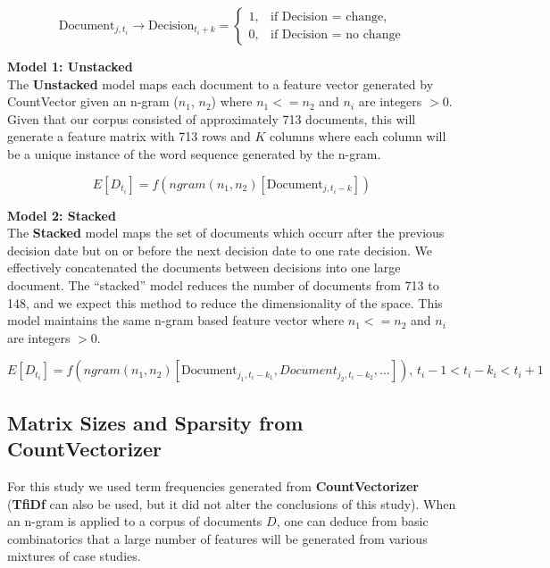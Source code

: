 \documentclass[11pt]{article}
\newcommand{\vertSpace}[1]{\vspace{3mm}}
\begin{document}
{\begin{equation*}
\mbox{Document}_{j,t_i} \rightarrow \mbox{Decision}_{t_i+k}
 = \begin{cases}
  1, & \text{if  Decision = change}, \\
  0, & \text{if  Decision = no change}
\end{cases}
\end{equation*}

\noindent 
\textbf{Model 1: Unstacked}\\
\noindent
The \textbf{Unstacked} model maps each document to a feature vector generated by CountVector given an n-gram ($n_1$, $n_2$) where $n_1 <= n_2$ and $n_i$ are integers $>0$.  Given that our corpus consisted of approximately 713 documents, this will generate a feature matrix with 713 rows and $K$ columns where each column will be a unique instance of the word sequence generated by the n-gram.

\begin{equation*}
E[D_{t_i}] = f(ngram(n_1, n_2)[\mbox{Document}_{j,t_i-k}])
\end{equation*}

\noindent
\textbf{Model 2: Stacked}\\
The \textbf{Stacked} model maps the set of documents which occurr after the previous decision date but on or before the next decision date to one rate decision.  We effectively concatenated the documents between decisions into one large document.  The ``stacked'' model reduces the number of documents from 713 to 148, and we expect this method to reduce the dimensionality of the space.  This model maintains the same n-gram based feature vector where $n_1 <= n_2$ and $n_i$ are integers $>0$.

\begin{equation*}
E[D_{t_i}] = f(ngram(n_1, n_2)[\mbox{Document}_{j_1,t_i-k_1},{Document}_{j_2,t_i-k_2},...]) \text{, } t_i-1 < t_i-k_i < t_i+1
\end{equation*}

\subsection{Matrix Sizes and Sparsity from CountVectorizer}

\noindent For this study we used term frequencies generated from \textbf{CountVectorizer} (\textbf{TfiDf} can also be used, but it did not alter the conclusions of this study).  When an n-gram is applied to a corpus of documents $D$, one can deduce from basic combinatorics that a large number of features will be generated from various mixtures of case studies.  \vertSpace

}
\end{document}

